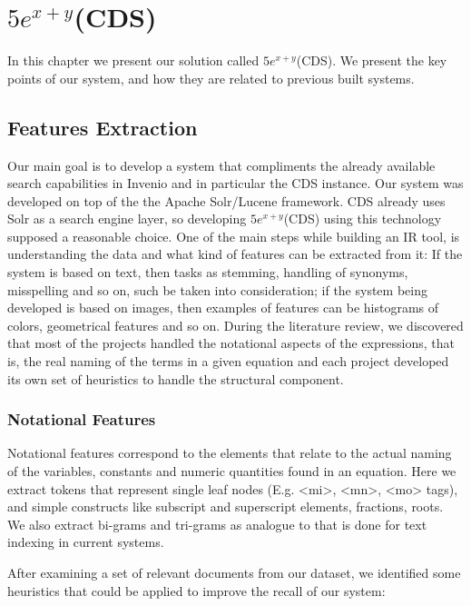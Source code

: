 
\chapter{$5e^{x+y}$(CDS)}
\label{chapter-cern_math_explorer}
In this chapter we present our solution called $5e^{x+y}$(CDS). We present the key points of our system, and how they are related to previous built systems.

\section{Features Extraction}
Our main goal is to develop a system that compliments the already available search capabilities in Invenio and in particular the CDS instance. Our system was developed on top of the  the Apache Solr/Lucene framework. CDS already uses Solr as a search engine layer, so developing $5e^{x+y}$(CDS) using this technology supposed a reasonable choice. One of the main steps while building an IR tool, is understanding the data and what kind of features can be extracted from it: If the system is based on text, then tasks as stemming, handling of synonyms, misspelling and so on, such be taken into consideration; if the system being developed is based on images, then examples of features can be histograms of colors, geometrical features and so on. During the literature review, we discovered that most of the projects handled the notational aspects of the expressions, that is, the real naming of the terms in a given equation and each project developed its own set of heuristics to handle the structural component. 


\subsection{Notational Features}
Notational features correspond to the elements that relate to the actual naming of the variables, constants and numeric quantities found in an equation. Here we extract tokens that represent single leaf nodes (E.g. <mi>, <mn>, <mo> tags), and simple constructs like subscript and superscript elements, fractions, roots.
We also extract bi-grams and tri-grams as analogue to that is done for text indexing in current systems.

After examining a set of relevant documents from our dataset, we identified some heuristics that could be applied to improve the recall of our system:



